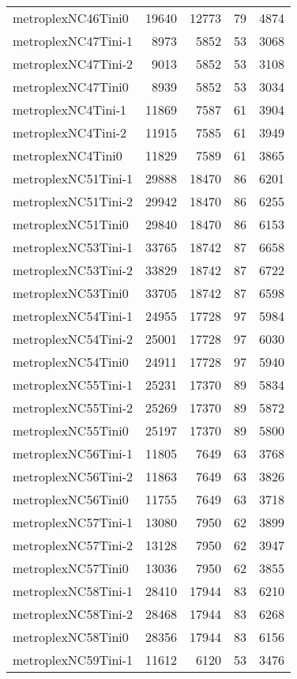 \begin{tabular}{lrrrr}
metroplexNC46Tini0 & 19640 & 12773 & 79 & 4874 \\
metroplexNC47Tini-1 & 8973 & 5852 & 53 & 3068 \\
metroplexNC47Tini-2 & 9013 & 5852 & 53 & 3108 \\
metroplexNC47Tini0 & 8939 & 5852 & 53 & 3034 \\
metroplexNC4Tini-1 & 11869 & 7587 & 61 & 3904 \\
metroplexNC4Tini-2 & 11915 & 7585 & 61 & 3949 \\
metroplexNC4Tini0 & 11829 & 7589 & 61 & 3865 \\
metroplexNC51Tini-1 & 29888 & 18470 & 86 & 6201 \\
metroplexNC51Tini-2 & 29942 & 18470 & 86 & 6255 \\
metroplexNC51Tini0 & 29840 & 18470 & 86 & 6153 \\
metroplexNC53Tini-1 & 33765 & 18742 & 87 & 6658 \\
metroplexNC53Tini-2 & 33829 & 18742 & 87 & 6722 \\
metroplexNC53Tini0 & 33705 & 18742 & 87 & 6598 \\
metroplexNC54Tini-1 & 24955 & 17728 & 97 & 5984 \\
metroplexNC54Tini-2 & 25001 & 17728 & 97 & 6030 \\
metroplexNC54Tini0 & 24911 & 17728 & 97 & 5940 \\
metroplexNC55Tini-1 & 25231 & 17370 & 89 & 5834 \\
metroplexNC55Tini-2 & 25269 & 17370 & 89 & 5872 \\
metroplexNC55Tini0 & 25197 & 17370 & 89 & 5800 \\
metroplexNC56Tini-1 & 11805 & 7649 & 63 & 3768 \\
metroplexNC56Tini-2 & 11863 & 7649 & 63 & 3826 \\
metroplexNC56Tini0 & 11755 & 7649 & 63 & 3718 \\
metroplexNC57Tini-1 & 13080 & 7950 & 62 & 3899 \\
metroplexNC57Tini-2 & 13128 & 7950 & 62 & 3947 \\
metroplexNC57Tini0 & 13036 & 7950 & 62 & 3855 \\
metroplexNC58Tini-1 & 28410 & 17944 & 83 & 6210 \\
metroplexNC58Tini-2 & 28468 & 17944 & 83 & 6268 \\
metroplexNC58Tini0 & 28356 & 17944 & 83 & 6156 \\
metroplexNC59Tini-1 & 11612 & 6120 & 53 & 3476 \\

\end{tabular}
